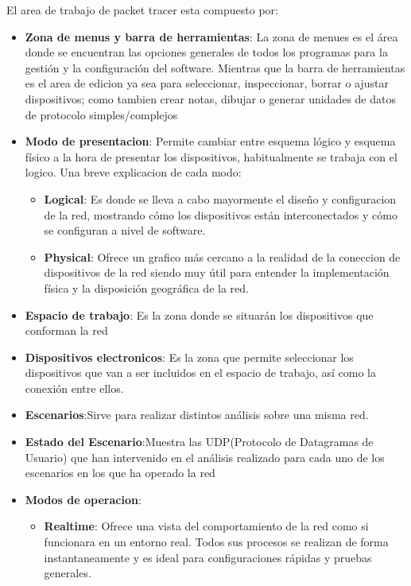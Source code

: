 \documentclass{article}
\begin{document}
        El area de trabajo de packet tracer esta compuesto por:
        \begin{itemize}
            \item \textbf{Zona de menus y barra de herramientas}: La zona de menues es el área donde se encuentran las opciones generales de todos los programas para la gestión y la configuración del software. 
            Mientras que la barra de herramientas es el area de edicion ya sea para seleccionar, inspeccionar, borrar o ajustar dispositivos; como tambien crear notas, dibujar o generar unidades de datos de protocolo simples/complejos
            
            \item \textbf{Modo de presentacion}: Permite cambiar entre esquema lógico y esquema físico a la hora de presentar los dispositivos, habitualmente se trabaja con el logico. Una breve explicacion de cada modo:
            \begin{itemize}
            \item \textbf{Logical}: Es donde se lleva a cabo mayormente el diseño y configuracion de la red, mostrando cómo los dispositivos están interconectados y cómo se configuran a nivel de software.
            \item \textbf{Physical}: Ofrece un grafico más cercano a la realidad de la coneccion de dispositivos de la red siendo muy útil para entender la implementación física y la disposición geográfica de la red.
            \end{itemize}
            
            \item \textbf{Espacio de trabajo}: Es la zona donde se situarán los dispositivos que conforman la red

            \item \textbf{Dispositivos electronicos}: Es la zona que permite seleccionar los dispositivos que van a ser incluidos en el espacio de trabajo, así como la conexión entre ellos.
            \item \textbf{Escenarios}:Sirve para realizar distintos análisis sobre una misma red.
            \item \textbf{Estado del Escenario}:Muestra las UDP(Protocolo de Datagramas de Usuario) que han intervenido en el análisis realizado para cada uno de los escenarios en los que ha operado la red
            \item \textbf{Modos de operacion}:
            \begin{itemize}
            \item \textbf{Realtime}: Ofrece una vista del comportamiento de la red como si funcionara en un entorno real. Todos sus procesos se realizan de forma instantaneamente y es ideal para configuraciones rápidas y pruebas generales.
            

\end{itemize}
\end{itemize}
\end{document}
